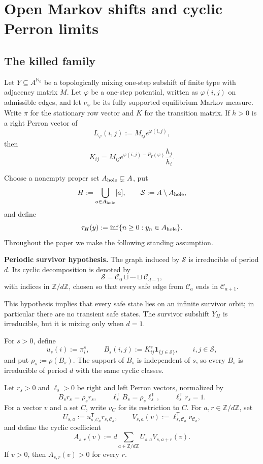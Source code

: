 \section{Open Markov shifts and cyclic Perron limits}
\label{sec:preliminaries}

\subsection{The killed family}

Let \(Y\subseteq A^{\mathbb N_0}\) be a topologically mixing one-step
subshift of finite type with adjacency matrix \(M\).  Let \(\varphi\)
be a one-step potential, written as \(\varphi(i,j)\) on admissible
edges, and let \(\nu_\varphi\) be its fully supported equilibrium Markov
measure.  Write \(\pi\) for the stationary row vector and \(K\) for the
transition matrix.  If \(h>0\) is a right Perron vector of
\[
  L_\varphi(i,j):=M_{ij}e^{\varphi(i,j)},
\]
then
\begin{equation}
  K_{ij}
  =M_{ij}e^{\varphi(i,j)-P_Y(\varphi)}\frac{h_j}{h_i}.
  \label{eq:markov-normalization}
\end{equation}

Choose a nonempty proper set \(A_{\rm hole}\subsetneq A\), put
\[
  H:=\bigcup_{a\in A_{\rm hole}}[a],
  \qquad
  \mathcal S:=A\setminus A_{\rm hole},
\]
and define
\[
  \tau_H(y):=\inf\{n\geq0:y_n\in A_{\rm hole}\}.
\]
Throughout the paper we make the following standing assumption.

\medskip
\noindent\textbf{Periodic survivor hypothesis.}
The graph induced by \(\mathcal S\) is irreducible of period \(d\).
Its cyclic decomposition is denoted by
\[
  \mathcal S=\mathcal C_0\sqcup\cdots\sqcup\mathcal C_{d-1},
\]
with indices in \(\mathbb Z/d\mathbb Z\), chosen so that every safe
edge from \(\mathcal C_a\) ends in \(\mathcal C_{a+1}\).

\medskip
This hypothesis implies that every safe state lies on an infinite
survivor orbit; in particular there are no transient safe states.  The
survivor subshift \(Y_H\) is irreducible, but it is mixing only when
\(d=1\).

For \(s>0\), define
\[
  u_s(i):=\pi_i^s,
  \qquad
  B_s(i,j):=K_{ij}^s\mathbf1_{\{j\in\mathcal S\}},
  \qquad i,j\in\mathcal S,
\]
and put \(\rho_s:=\rho(B_s)\).  The support of \(B_s\) is independent
of \(s\), so every \(B_s\) is irreducible of period \(d\) with the
same cyclic classes.

Let \(r_s>0\) and \(\ell_s>0\) be right and left Perron vectors,
normalized by
\[
  B_sr_s=\rho_sr_s,
  \qquad
  \ell_s^{\mathsf T}B_s=\rho_s\ell_s^{\mathsf T},
  \qquad
  \ell_s^{\mathsf T}r_s=1.
\]
For a vector \(v\) and a set \(C\), write \(v_C\) for its restriction
to \(C\).  For \(a,r\in\mathbb Z/d\mathbb Z\), set
\[
  U_{s,a}:=u_{s,\mathcal C_a}^{\mathsf T}r_{s,\mathcal C_a},
  \qquad
  V_{s,a}(v):=\ell_{s,\mathcal C_a}^{\mathsf T}v_{\mathcal C_a},
\]
and define the cyclic coefficient
\begin{equation}
  A_{s,r}(v)
  :=d\sum_{a\in\mathbb Z/d\mathbb Z}
       U_{s,a}V_{s,a+r}(v).
  \label{eq:cyclic-coefficient}
\end{equation}
If \(v>0\), then \(A_{s,r}(v)>0\) for every \(r\).

